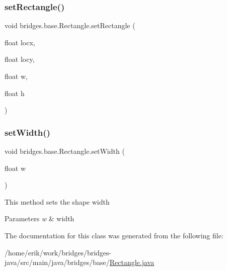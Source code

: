 \subsubsection{\texorpdfstring{set\+Rectangle()}{setRectangle()}}
{\footnotesize\ttfamily void bridges.\+base.\+Rectangle.\+set\+Rectangle (\begin{DoxyParamCaption}\item[{float}]{locx,  }\item[{float}]{locy,  }\item[{float}]{w,  }\item[{float}]{h }\end{DoxyParamCaption})}

\mbox{\label{classbridges_1_1base_1_1_rectangle_a1c42d0e5fc64adc1c2a696c88dd6f82e}} 
\subsubsection{\texorpdfstring{set\+Width()}{setWidth()}}
{\footnotesize\ttfamily void bridges.\+base.\+Rectangle.\+set\+Width (\begin{DoxyParamCaption}\item[{float}]{w }\end{DoxyParamCaption})}

This method sets the shape width


\begin{DoxyParams}{Parameters}
{\em w} & width \\
\hline
\end{DoxyParams}


The documentation for this class was generated from the following file\+:\begin{DoxyCompactItemize}
\item 
/home/erik/work/bridges/bridges-\/java/src/main/java/bridges/base/\hyperlink{_rectangle_8java}{Rectangle.\+java}\end{DoxyCompactItemize}
